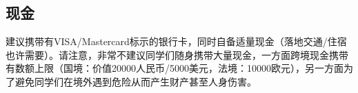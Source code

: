\subsection{现金}
建议携带有VISA/Mastercard标示的银行卡，同时自备适量现金（落地交通/住宿也许需要）。请注意，非常不建议同学们随身携带大量现金，一方面跨境现金携带有数额上限（国境：价值20000人民币/5000美元，法境：10000欧元），另一方面为了避免同学们在境外遇到危险从而产生财产甚至人身伤害。
